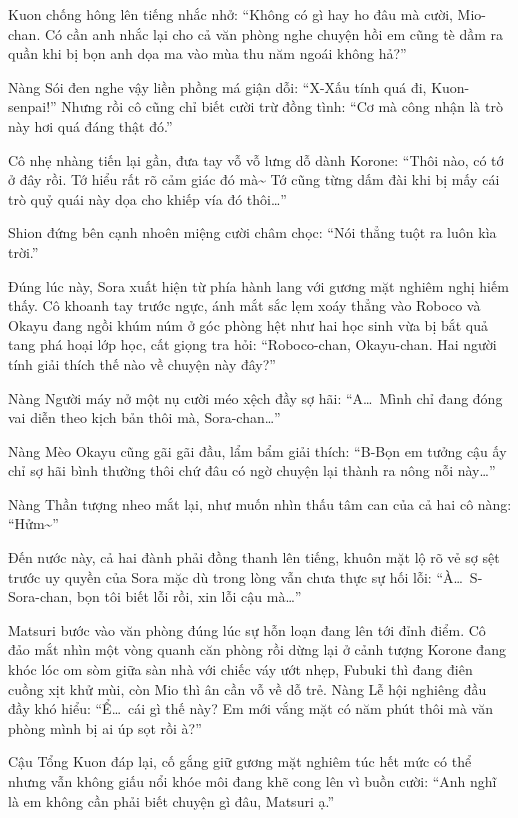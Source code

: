 \documentclass[../main.tex]{subfiles}
\begin{document}
Kuon chống hông lên tiếng nhắc nhở: ``Không có gì hay ho đâu mà cười, Mio-chan. Có cần anh nhắc lại cho cả văn phòng nghe chuyện hồi em cũng tè dầm ra quần khi bị bọn anh dọa ma vào mùa thu năm ngoái không hả?''

Nàng Sói đen nghe vậy liền phồng má giận dỗi: ``X-Xấu tính quá đi, Kuon-senpai!'' Nhưng rồi cô cũng chỉ biết cười trừ đồng tình: ``Cơ mà công nhận là trò này hơi quá đáng thật đó.''

Cô nhẹ nhàng tiến lại gần, đưa tay vỗ vỗ lưng dỗ dành Korone: ``Thôi nào, có tớ ở đây rồi. Tớ hiểu rất rõ cảm giác đó mà\~{} Tớ cũng từng dấm đài khi bị mấy cái trò quỷ quái này dọa cho khiếp vía đó thôi\dots''

Shion đứng bên cạnh nhoên miệng cười châm chọc: ``Nói thẳng tuột ra luôn kìa trời.''

Đúng lúc này, Sora xuất hiện từ phía hành lang với gương mặt nghiêm nghị hiếm thấy. Cô khoanh tay trước ngực, ánh mắt sắc lẹm xoáy thẳng vào Roboco và Okayu đang ngồi khúm núm ở góc phòng hệt như hai học sinh vừa bị bắt quả tang phá hoại lớp học, cất giọng tra hỏi: ``Roboco-chan, Okayu-chan. Hai người tính giải thích thế nào về chuyện này đây?''

Nàng Người máy nở một nụ cười méo xệch đầy sợ hãi: ``A\dots\ Mình chỉ đang đóng vai diễn theo kịch bản thôi mà, Sora-chan\dots''

Nàng Mèo Okayu cũng gãi gãi đầu, lẩm bẩm giải thích: ``B-Bọn em tưởng cậu ấy chỉ sợ hãi bình thường thôi chứ đâu có ngờ chuyện lại thành ra nông nỗi này\dots''

Nàng Thần tượng nheo mắt lại, như muốn nhìn thấu tâm can của cả hai cô nàng: ``Hửm\~{}''

Đến nước này, cả hai đành phải đồng thanh lên tiếng, khuôn mặt lộ rõ vẻ sợ sệt trước uy quyền của Sora mặc dù trong lòng vẫn chưa thực sự hối lỗi: ``À\dots\ S-Sora-chan, bọn tôi biết lỗi rồi, xin lỗi cậu mà\dots''

Matsuri bước vào văn phòng đúng lúc sự hỗn loạn đang lên tới đỉnh điểm. Cô đảo mắt nhìn một vòng quanh căn phòng rồi dừng lại ở cảnh tượng Korone đang khóc lóc om sòm giữa sàn nhà với chiếc váy ướt nhẹp, Fubuki thì đang điên cuồng xịt khử mùi, còn Mio thì ân cần vỗ về dỗ trẻ. Nàng Lễ hội nghiêng đầu đầy khó hiểu: ``Ể\dots\ cái gì thế này? Em mới vắng mặt có năm phút thôi mà văn phòng mình bị ai úp sọt rồi à?''

Cậu Tổng Kuon đáp lại, cố gắng giữ gương mặt nghiêm túc hết mức có thể nhưng vẫn không giấu nổi khóe môi đang khẽ cong lên vì buồn cười: ``Anh nghĩ là em không cần phải biết chuyện gì đâu, Matsuri ạ.''
\end{document}
